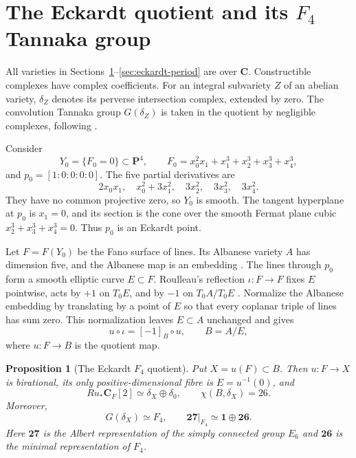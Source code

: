 \documentclass[11pt,reqno]{amsart}
\numberwithin{equation}{section}
\newtheorem{proposition}[theorem]{Proposition}
\theoremstyle{definition}
\theoremstyle{remark}
\newcommand{\C}{\mathbf C}
\newcommand{\PP}{\mathbf P}
\begin{document}
\section{The Eckardt quotient and its \texorpdfstring{$F_4$}{F4} Tannaka group}\label{sec:f4}

All varieties in Sections~\ref{sec:f4}--\ref{sec:eckardt-period} are over $\C$.  Constructible complexes have complex coefficients.  For an integral subvariety $Z$ of an abelian variety, $\delta_Z$ denotes its perverse intersection complex, extended by zero.  The convolution Tannaka group $G(\delta_Z)$ is taken in the quotient by negligible complexes, following \cite{KramerWeissauer2015}.

Consider
\begin{equation}\label{eq:Y0}
Y_0=\{F_0=0\}\subset\PP^4,
\qquad
F_0=x_0^2x_1+x_1^3+x_2^3+x_3^3+x_4^3,
\end{equation}
and $p_0=[1:0:0:0:0]$.  The five partial derivatives are
\[
2x_0x_1,\quad x_0^2+3x_1^2,\quad3x_2^2,\quad3x_3^2,\quad3x_4^2.
\]
They have no common projective zero, so $Y_0$ is smooth.  The tangent hyperplane at $p_0$ is $x_1=0$, and its section is the cone over the smooth Fermat plane cubic $x_2^3+x_3^3+x_4^3=0$.  Thus $p_0$ is an Eckardt point.

Let $F=F(Y_0)$ be the Fano surface of lines.  Its Albanese variety $A$ has dimension five, and the Albanese map is an embedding \cite{ClemensGriffiths1972}.  The lines through $p_0$ form a smooth elliptic curve $E\subset F$.  Roulleau's reflection $\iota:F\to F$ fixes $E$ pointwise, acts by $+1$ on $T_0E$, and by $-1$ on $T_0A/T_0E$ \cite{Roulleau2009}.  Normalize the Albanese embedding by translating by a point of $E$ so that every coplanar triple of lines has sum zero.  This normalization leaves $E\subset A$ unchanged and gives
\begin{equation}\label{eq:reflection-quotient}
u\circ\iota=[-1]_B\circ u,
\qquad B=A/E,
\end{equation}
where $u:F\to B$ is the quotient map.

\begin{proposition}[The Eckardt $F_4$ quotient]\label{prop:f4-quotient}
Put $X=u(F)\subset B$.  Then $u:F\to X$ is birational, its only positive-dimensional fibre is $E=u^{-1}(0)$, and
\begin{equation}\label{eq:semismall}
Ru_*\C_F[2]\simeq\delta_X\oplus\delta_0,
\qquad \chi(B,\delta_X)=26.
\end{equation}
Moreover,
\begin{equation}\label{eq:f4-group}
G(\delta_X)\simeq F_4,
\qquad
\mathbf{27}|_{F_4}\simeq\mathbf1\oplus\mathbf{26}.
\end{equation}
Here $\mathbf{27}$ is the Albert representation of the simply connected group $E_6$ and $\mathbf{26}$ is the minimal representation of $F_4$.
\end{proposition}
\end{document}
